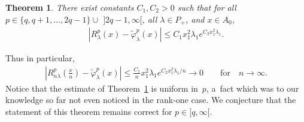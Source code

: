 \documentclass[11pt]{article}
\numberwithin{equation}{section}
\newtheorem{Theorem}{Theorem}[section]
\begin{document}
\begin{Theorem}
\label{vgl-Bessel}
There exist constants $C_1,C_2>0$ such that for all $p\in\{q,q+1,\ldots,2q-1\}\cup$ $] 2q-1,\infty[$, all $\lambda\in
P_+$, and $ x\in A_0$,
\begin{gather*}
\left|R_{\lambda}^p(x)-\widetilde\varphi_\lambda^{p} (x)\right|\leq C_1  x_1^2\lambda_1  e^{C_2 x_1^2\lambda_1}.
\end{gather*}
\end{Theorem}
Thus in particular,
\begin{gather*}
\left|R_{n\lambda}^p \left(\frac{x}{n}\right)-\widetilde\varphi_\lambda^{p}(x)\right|\leq \frac{C_1}{n}
x_1^2\lambda_1  e^{C_2 x_1^2\lambda_1/n} \to 0
\qquad
\text{for}
\quad
n\to \infty.
\end{gather*}
Notice that the estimate of Theorem~\ref{vgl-Bessel} is uniform in~$p$, a~fact which was to our knowledge so far not
even noticed in the rank-one case.
We conjecture that the statement of this theorem remains correct for $p\in [q,\infty[$.
\end{document}
